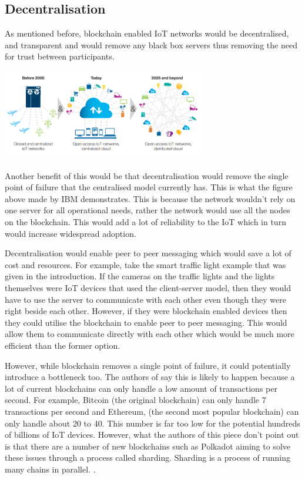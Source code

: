 \documentclass[transmag]{IEEEtran}
\begin{document}
\subsection{Decentralisation}
As mentioned before, blockchain enabled IoT networks would be decentralised, and transparent and would remove any black box servers thus removing the need for trust between participants. 

\centerline{
    \includegraphics[width=3.5in]{ibm.png}
}
Another benefit of this would be that decentralisation would remove the single point of failure that the centralised model currently has. This is what the figure above made by IBM \cite{ref12} demonstrates. This is because the network wouldn't rely on one server for all operational needs, rather the network would use all the nodes on the blockchain. \cite{ref6} \cite{ref11} This would add a lot of reliability to the IoT which in turn would increase widespread adoption.
\par Decentralisation would enable peer to peer messaging which would save a lot of cost and resources. For example, take the smart traffic light example that was given in the introduction. If the cameras on the traffic lights and the lights themselves were IoT devices that used the client-server model, then they would have to use the server to communicate with each other even though they were right beside each other. However, if they were blockchain enabled devices then they could utilise the blockchain to enable peer to peer messaging. This would allow them to communicate directly with each other which would be much more efficient than the former option.
\par However, while blockchain removes a single point of failure, it could potentially introduce a bottleneck too. The authors of \cite{ref7} say this is likely to happen because a lot of current blockchains can only handle a low amount of transactions per second. For example, Bitcoin (the original blockchain) can only handle 7 transactions per second and Ethereum, (the second most popular blockchain) can only handle about 20 to 40. This number is far too low for the potential hundreds of billions of IoT devices. However, what the authors of this piece don't point out is that there are a number of new blockchains such as Polkadot aiming to solve these issues through a process called sharding. Sharding is a process of running many chains in parallel. \cite{polka}.
\end{document}
